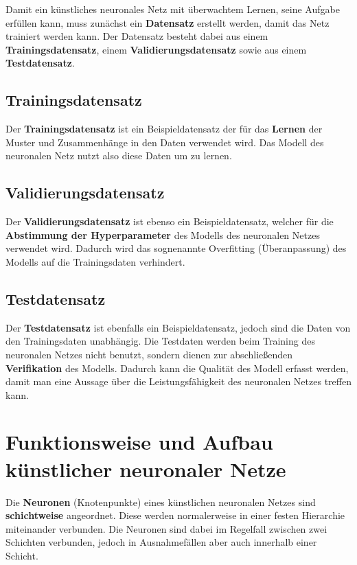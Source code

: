 Damit ein künstliches neuronales Netz mit überwachtem Lernen, seine Aufgabe erfüllen kann, muss zunächst ein \textbf{Datensatz} erstellt werden, damit das Netz trainiert werden kann. Der Datensatz besteht dabei aus einem \textbf{Trainingsdatensatz}, einem \textbf{Validierungsdatensatz} sowie aus einem \textbf{Testdatensatz}. \\

\subsection{Trainingsdatensatz}

Der \textbf{Trainingsdatensatz} ist ein Beispieldatensatz der für das \textbf{Lernen} der Muster und Zusammenhänge in den Daten verwendet wird. Das Modell des neuronalen Netz nutzt also diese Daten um zu lernen. \cite{datasolut} \\

\subsection{Validierungsdatensatz}

Der \textbf{Validierungsdatensatz} ist ebenso ein Beispieldatensatz, welcher für die \textbf{Abstimmung der Hyperparameter} des Modells des neuronalen Netzes verwendet wird. Dadurch wird das sognenannte \glqq Overfitting\grqq{} (Überanpassung) des Modells auf die Trainingsdaten verhindert. \cite{datasolut} \\

\subsection{Testdatensatz}

Der \textbf{Testdatensatz} ist ebenfalls ein Beispieldatensatz, jedoch sind die Daten von den Trainingsdaten unabhängig. Die Testdaten werden beim Training des neuronalen Netzes nicht benutzt, sondern dienen zur abschließenden \textbf{Verifikation} des Modells. Dadurch kann die Qualität des Modell erfasst werden, damit man eine Aussage über die Leistungsfähigkeit des neuronalen Netzes treffen kann. \cite{datasolut} \\

\section{Funktionsweise und Aufbau künstlicher neuronaler Netze}

Die \textbf{Neuronen} (Knotenpunkte) eines künstlichen neuronalen Netzes sind \textbf{schichtweise} angeordnet. Diese werden normalerweise in einer festen Hierarchie miteinander verbunden. Die Neuronen sind dabei im Regelfall zwischen zwei Schichten verbunden, jedoch in Ausnahmefällen aber auch innerhalb einer Schicht. \cite{jaai} \\

